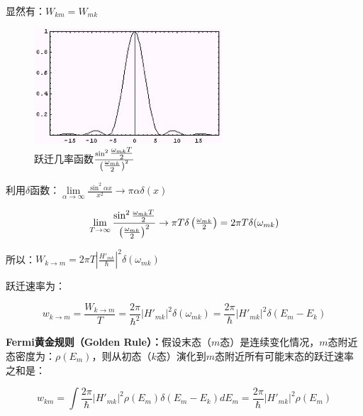 显然有：$W_{km}  = W_{mk} $


\begin{figure}[h]
\begin{center}
\includegraphics[clip,width=7cm]{Perturbation/ConstantPerturbation.ps}
\caption{跃迁几率函数$\frac{{\sin ^2 {\textstyle{{\omega _{mk} T}
\over 2}}}}{{\left( {{\textstyle{{\omega _{mk} } \over 2}}}
\right)^2 }}$}
\end{center}
\end{figure}

利用$\delta$函数：$\mathop {\lim }\limits_{\alpha  \to \infty }
\frac{{\sin ^2 \alpha x}}{{x^2 }} \to \pi \alpha \delta (x)$


\begin{equation}\label{24-18}
\mathop {\lim }\limits_{T \to \infty } \frac{{\sin ^2
{\textstyle{{\omega _{mk} T} \over 2}}}}{{\left(
{{\textstyle{{\omega _{mk} } \over 2}}} \right)^2 }} \to \pi T\delta
\left( {{\textstyle{{\omega _{mk} } \over 2}}} \right) = 2\pi
T\delta (\omega _{mk} )
\end{equation}

所以：$W_{k \to m}  = 2\pi T\left| {\frac{{H'_{mk} }}{\hbar }}
\right|^2 \delta (\omega _{mk} )$

跃迁速率为：

\begin{equation}\label{24-19}
w_{k \to m}  = \frac{{W_{k \to m} }}{T} = \frac{{2\pi }}{{\hbar ^2
}}\left| {H'_{mk} } \right|^2 \delta (\omega _{mk} ) = \frac{{2\pi
}}{\hbar }\left| {H'_{mk} } \right|^2 \delta (E_m  - E_k )
\end{equation}

\textbf{Fermi黄金规则（Golden Rule）：}假设末态（$m$态）是连续变化情况，$m$态附近态密度为：$\rho(E_m)$，则从初态（$k$态）演化到$m$态附近所有可能末态的跃迁速率之和是：


\begin{equation}\label{24-20}
w_{km}  = \int {\frac{{2\pi }}{\hbar }\left| {H'_{mk} } \right|^2
\rho (E_m )\delta (E_m  - E_k )} dE_m  = \frac{{2\pi }}{\hbar
}\left| {H'_{mk} } \right|^2 \rho (E_m )
\end{equation}


